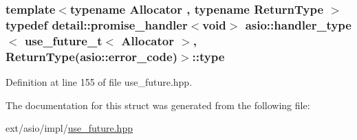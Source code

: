 \subsubsection[{type}]{\setlength{\rightskip}{0pt plus 5cm}template$<$typename Allocator , typename Return\+Type $>$ typedef {\bf detail\+::promise\+\_\+handler}$<$void$>$ {\bf asio\+::handler\+\_\+type}$<$ {\bf use\+\_\+future\+\_\+t}$<$ Allocator $>$,           Return\+Type({\bf asio\+::error\+\_\+code})$>$\+::{\bf type}}\label{structasio_1_1handler__type_3_01use__future__t_3_01_allocator_01_4_00_01_01_01_01_01_01_01_01_01e03a2a25b6ea2f5e6fbc374eca266e19_a8d732ade8f0fbf4f1950311ed58a1e4c}


Definition at line 155 of file use\+\_\+future.\+hpp.



The documentation for this struct was generated from the following file\+:\begin{DoxyCompactItemize}
\item 
ext/asio/impl/\hyperlink{impl_2use__future_8hpp}{use\+\_\+future.\+hpp}\end{DoxyCompactItemize}
